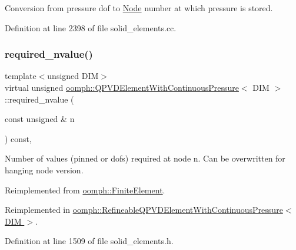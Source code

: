 Conversion from pressure dof to \hyperlink{classoomph_1_1Node}{Node} number at which pressure is stored. 



Definition at line 2398 of file solid\+\_\+elements.\+cc.

\mbox{\label{classoomph_1_1QPVDElementWithContinuousPressure_a58a49882b5db5b044017f0a35bb41241}} 
\subsubsection{\texorpdfstring{required\+\_\+nvalue()}{required\_nvalue()}}
{\footnotesize\ttfamily template$<$unsigned D\+IM$>$ \\
virtual unsigned \hyperlink{classoomph_1_1QPVDElementWithContinuousPressure}{oomph\+::\+Q\+P\+V\+D\+Element\+With\+Continuous\+Pressure}$<$ D\+IM $>$\+::required\+\_\+nvalue (\begin{DoxyParamCaption}\item[{const unsigned \&}]{n }\end{DoxyParamCaption}) const\hspace{0.3cm}{\ttfamily [inline]}, {\ttfamily [virtual]}}



Number of values (pinned or dofs) required at node n. Can be overwritten for hanging node version. 



Reimplemented from \hyperlink{classoomph_1_1FiniteElement_a56610c60d5bc2d7c27407a1455471b1a}{oomph\+::\+Finite\+Element}.



Reimplemented in \hyperlink{classoomph_1_1RefineableQPVDElementWithContinuousPressure_a1ab39caa5f26573cb1d38ab8f9f0d76d}{oomph\+::\+Refineable\+Q\+P\+V\+D\+Element\+With\+Continuous\+Pressure$<$ D\+I\+M $>$}.



Definition at line 1509 of file solid\+\_\+elements.\+h.

\mbox{\label{classoomph_1_1QPVDElementWithContinuousPressure_a796553fe8e806158167c598e4c85596f}} 
